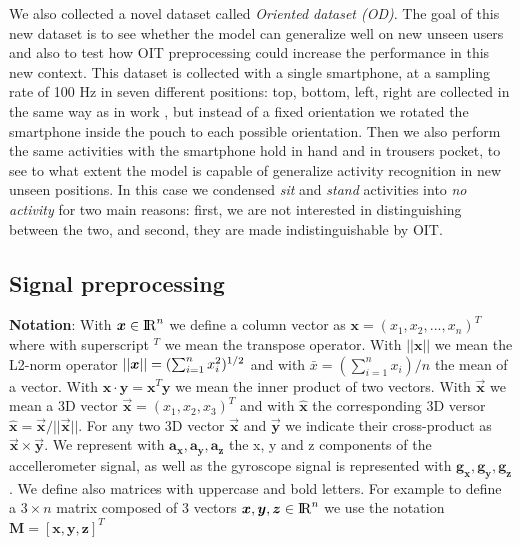 We also collected a novel dataset called \textit{Oriented dataset
  (OD)}. The goal of this new dataset is to see whether the model can
generalize well on new unseen users and also to test how OIT
preprocessing could increase the performance in this new context. This
dataset is collected with a single smartphone, at a sampling rate of
100 Hz in seven different positions: top, bottom, left, right are
collected in the same way as in work \cite{stisen2015smart}, but
instead of a fixed orientation we rotated the smartphone inside the
pouch to each possible orientation. Then we also perform the same
activities with the smartphone hold in hand and in trousers pocket, to
see to what extent the model is capable of generalize activity
recognition in new unseen positions. In this case we condensed
\textit{sit} and \textit{stand} activities into \textit{no activity}
for two main reasons: first, we are not interested in distinguishing
between the two, and second, they are made indistinguishable by OIT.

\subsection{Signal preprocessing}

\textbf{Notation}: With $\boldsymbol{x} \in {\rm I\!R}^{n}$ we define a column vector as $\boldsymbol{x}=(x_{1}, x_{2}, ..., x_{n})^{T}$ where with superscript $^T$ we mean the transpose operator. With $\boldsymbol{||x||}$ we mean the L2-norm operator $||\boldsymbol{x}|| = (\sum_{i=1}^{n} x_{i}^{2})^{1/2}$ and with $\bar{x} = (\sum_{i=1}^{n} x_{i}) / n$ the mean of a vector. With $\boldsymbol{x} \cdot \boldsymbol{y} =\boldsymbol{x}^{T}\boldsymbol{y} $ we mean the inner product of two vectors. With $\boldsymbol{\vec{x}}$ we mean a 3D vector $\boldsymbol{\vec{x}} = (x_{1}, x_{2}, x_{3})^{T}$ and with $\boldsymbol{\hat{x}}$ the corresponding 3D versor $\boldsymbol{\hat{x}}=\boldsymbol{\vec{x}}/ ||\boldsymbol{\vec{x}}||$. For any two 3D vector $\boldsymbol{\vec{x}}$ and $\boldsymbol{\vec{y}}$ we indicate their cross-product as $\boldsymbol{\vec{x}} \times \boldsymbol{\vec{y}}$. We represent with $\boldsymbol{a_{x}}, \boldsymbol{a_{y}}, \boldsymbol{a_{z}}$ the x, y and z components of the accellerometer signal, as well as the gyroscope signal is represented with $\boldsymbol{g_{x}}, \boldsymbol{g_{y}}, \boldsymbol{g_{z}}$. We define also matrices with uppercase and bold letters. For example to define a $3 \times n$ matrix composed of 3 vectors \mbox{$\boldsymbol{x}, \boldsymbol{y}, \boldsymbol{z} \in {\rm I\!R}^{n}$} we use the notation \mbox{$\boldsymbol{M} = [\boldsymbol{x}, \boldsymbol{y}, \boldsymbol{z}]^{T}$}\\

